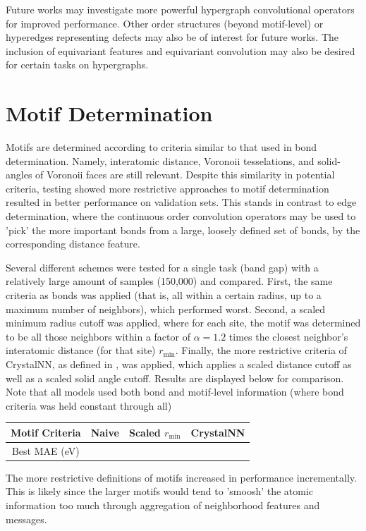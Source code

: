 \documentclass[10pt,a4paper]{article}
\begin{document}
Future works may investigate more powerful hypergraph convolutional  operators for improved performance. Other order structures (beyond motif-level) or hyperedges representing defects may also be of interest for future works. The inclusion of equivariant features and equivariant convolution may also be desired for certain tasks on hypergraphs.



\nocite{*}




\appendix

\section{Motif Determination}
Motifs are determined according to criteria similar to that used in bond determination. Namely, interatomic distance, Voronoii tesselations, and solid-angles of Voronoii faces are still relevant. Despite this similarity in potential criteria, testing showed more restrictive approaches to motif determination resulted in better performance on validation sets. This stands in contrast to edge determination, where the continuous order convolution operators may be used to 'pick' the more important bonds from a large, loosely defined set of bonds, by the corresponding distance feature.

Several different schemes were tested for a single task (band gap) with a relatively large amount of samples (150,000) and compared. First, the same criteria as bonds was applied (that is, all within a certain radius, up to a maximum number of neighbors), which performed worst. Second, a scaled minimum radius cutoff was applied, where for each site, the motif was determined to be all those neighbors within a factor of $\alpha=1.2$ times the closest neighbor's interatomic distance (for that site) $r_{\text{min}}$. Finally, the more restrictive criteria of CrystalNN, as defined in \cite{crystalnn}, was applied, which applies a scaled distance cutoff as well as a scaled solid angle cutoff. Results are displayed below for comparison. Note that all models used both bond and motif-level information (where bond criteria was held constant through all)

\begin{center}

\begin{tabular}{c|ccc}

Motif Criteria & Naive & Scaled $r_{\text{min}}$& CrystalNN \\
\hline
Best MAE (eV)  \\
\end{tabular}
\end{center}
The more restrictive definitions of motifs increased in performance incrementally. This is likely since the larger motifs would tend to 'smoosh' the atomic information too much through aggregation of neighborhood features and messages.
\end{document}
